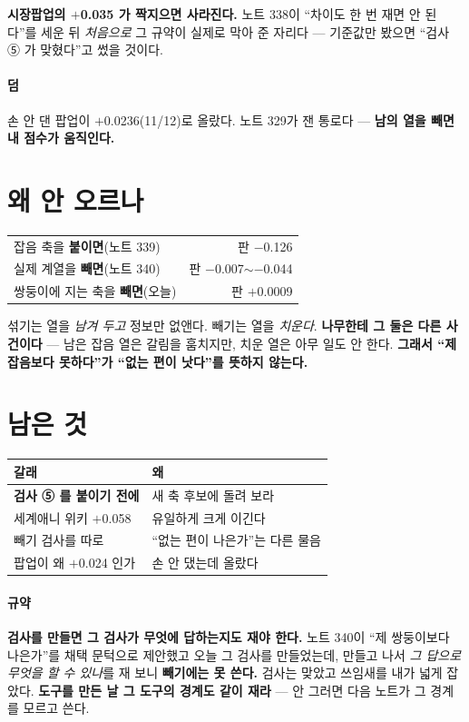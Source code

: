 \documentclass[10pt]{article}
\begin{document}
\textbf{시장팝업의 $+$0.035 가 짝지으면 사라진다.} 노트 338이 ``차이도
한 번 재면 안 된다''를 세운 뒤 \emph{처음으로} 그 규약이 실제로 막아
준 자리다 --- 기준값만 봤으면 ``검사 ⑤ 가 맞혔다''고 썼을 것이다.

\paragraph{덤} 손 안 댄 팝업이 $+$0.0236(11/12)로 올랐다. 노트 329가
잰 통로다 --- \textbf{남의 열을 빼면 내 점수가 움직인다.}

\section{왜 안 오르나}

\begin{center}\footnotesize
\begin{tabular}{lr}
\hline
잡음 축을 \textbf{붙이면}(노트 339) & 판 $-$0.126 \\
실제 계열을 \textbf{빼면}(노트 340) & 판 $-$0.007$\sim$$-$0.044 \\
쌍둥이에 지는 축을 \textbf{빼면}(오늘) & 판 $+$0.0009 \\
\hline
\end{tabular}
\end{center}

섞기는 열을 \emph{남겨 두고} 정보만 없앤다. 빼기는 열을 \emph{치운다}.
\textbf{나무한테 그 둘은 다른 사건이다} --- 남은 잡음 열은 갈림을
훔치지만, 치운 열은 아무 일도 안 한다. \textbf{그래서 ``제 잡음보다
못하다''가 ``없는 편이 낫다''를 뜻하지 않는다.}

\section{남은 것}
\begin{center}\footnotesize
\begin{tabular}{ll}
\hline
갈래 & 왜 \\
\hline
\textbf{검사 ⑤ 를 붙이기 전에} & 새 축 후보에 돌려 보라 \\
세계애니 위키 $+$0.058 & 유일하게 크게 이긴다 \\
빼기 검사를 따로 & ``없는 편이 나은가''는 다른 물음 \\
팝업이 왜 $+$0.024 인가 & 손 안 댔는데 올랐다 \\
\hline
\end{tabular}
\end{center}

\paragraph{규약} \textbf{검사를 만들면 그 검사가 무엇에 답하는지도 재야
한다.} 노트 340이 ``제 쌍둥이보다 나은가''를 채택 문턱으로 제안했고 오늘
그 검사를 만들었는데, 만들고 나서 \emph{그 답으로 무엇을 할 수 있나}를
재 보니 \textbf{빼기에는 못 쓴다.} 검사는 맞았고 쓰임새를 내가 넓게
잡았다. \textbf{도구를 만든 날 그 도구의 경계도 같이 재라} --- 안 그러면
다음 노트가 그 경계를 모르고 쓴다.
\end{document}
